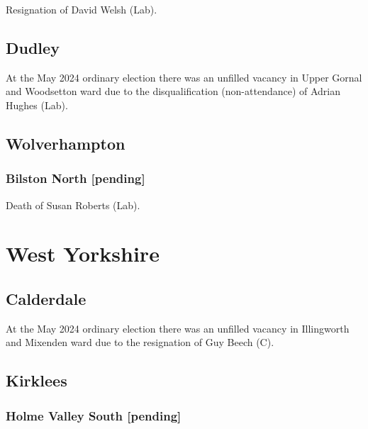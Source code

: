 \documentclass[a4paper,openany]{book}
\begin{document}
\begin{resultsiii}

Resignation of David Welsh (Lab).

\subsection*{Dudley}

At the May 2024 ordinary election there was an unfilled vacancy in Upper Gornal and Woodsetton ward due to the disqualification (non-attendance) of Adrian Hughes (Lab).%

\subsection*{Wolverhampton}

\subsubsection*{Bilston North \hspace*{\fill}\nolinebreak[1]%
	\enspace\hspace*{\fill}
	[pending]}


Death of Susan Roberts (Lab).

\section{West Yorkshire}

\subsection*{Calderdale}

At the May 2024 ordinary election there was an unfilled vacancy in Illingworth and Mixenden ward due to the resignation of Guy Beech (C).%

\subsection*{Kirklees}

\subsubsection*{Holme Valley South \hspace*{\fill}\nolinebreak[1]%
	\enspace\hspace*{\fill}
	[pending]}


\end{resultsiii}
\end{document}
